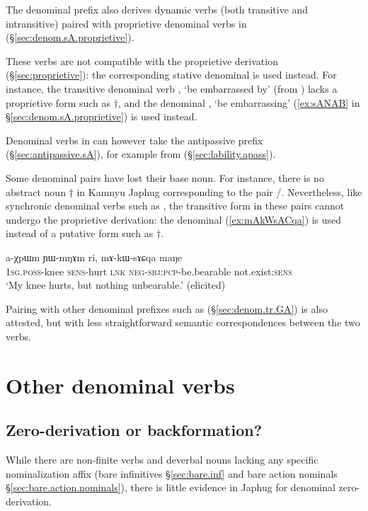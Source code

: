 The  denominal prefix also derives dynamic verbs (both transitive and intransitive) paired with proprietive denominal verbs in  (§\ref{sec:denom.sA.proprietive}). 

 These verbs are not compatible with the proprietive  derivation (§\ref{sec:proprietive}): the corresponding stative  denominal is used instead. For instance, the transitive denominal verb , `be embarrassed by' (from ) lacks a proprietive form such as $\dagger$, and the denominal , `be embarrassing' (\ref{ex:sANAB} in §\ref{sec:denom.sA.proprietive})  is used instead.

 Denominal verbs in  can however take the  antipassive prefix (§\ref{sec:antipassive.sA}), for example  from  (§\ref{sec:lability.apass}).

 Some  denominal pairs have lost their base noun. For instance, there is no abstract noun $\dagger$ in Kamnyu Japhug corresponding to the pair /. Nevertheless, like synchronic denominal verbs such as , the transitive form in these pairs cannot undergo the proprietive derivation:  the denominal   (\ref{ex:mAkWsACqa})  is used instead of a putative form such as  $\dagger$.
 
\begin{exe}
\ex \label{ex:mAkWsACqa}
\gll a-χpɯm ɲɯ-mŋɤm ri, mɤ-kɯ-sɤɕqa maŋe \\
\textsc{1sg}.\textsc{poss}-knee \textsc{sens}-hurt \textsc{lnk} \textsc{neg}-\textsc{sbj}:\textsc{pcp}-be.bearable not.exist:\textsc{sens} \\
\glt `My knee hurts, but nothing unbearable.' (elicited)
\end{exe}

Pairing with other denominal prefixes such as  (§\ref{sec:denom.tr.GA}) is also attested, but with less straightforward semantic correspondences between the two verbs.

\section{Other denominal verbs}  \label{sec:denom.other}

\subsection{Zero-derivation or backformation?}  \label{sec:verb.backformation}
While there are non-finite verbs and deverbal nouns lacking any specific nominalization affix (bare infinitives §\ref{sec:bare.inf} and bare action nominals §\ref{sec:bare.action.nominals}), there is little evidence in Japhug for denominal zero-derivation. 

